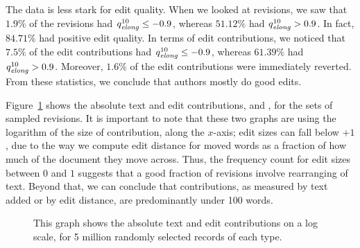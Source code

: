 The data is less stark for edit quality.
When we looked at revisions, we saw that $1.9\%$ of the revisions
had $\quality{elong}{10}{} \le -0.9$, whereas $51.12\%$ had
$\quality{elong}{10}{} > 0.9$.
In fact, $84.71\%$ had positive edit quality.
In terms of edit contributions, we noticed that $7.5\%$ of the
edit contributions had $\quality{elong}{10}{} \le -0.9$, whereas
$61.39\%$ had $\quality{elong}{10}{} > 0.9$.
Moreover, $1.6\%$ of the edit contributions were immediately
reverted.
From these statistics, we conclude that authors mostly do good
edits.

Figure~\ref{fig-revs-contrib} shows the absolute text and edit 
contributions,  and , for the sets of sampled revisions.
It is important to note that these two graphs are using
the logarithm of the size of contribution, along the $x$-axis;
edit sizes can fall below $+1$, due to the way we compute
edit distance for moved words as a fraction of how much of
the document they move across.
Thus, the frequency count for edit sizes between $0$ and $1$
suggests that a good fraction of revisions involve rearranging
of text.
Beyond that, we can conclude that contributions, as measured
by text added or by edit distance, are predominantly under
100 words.
%
\begin{figure}[tbhp]
    \begin{center}
    \end{center}
    \caption[Measuring total edit and text contribution over revisions]{
        This graph shows the absolute text and edit contributions 
        on a log scale, for 5 million randomly selected records
	of each type.
    }
    \label{fig-revs-contrib}
\end{figure}
%

